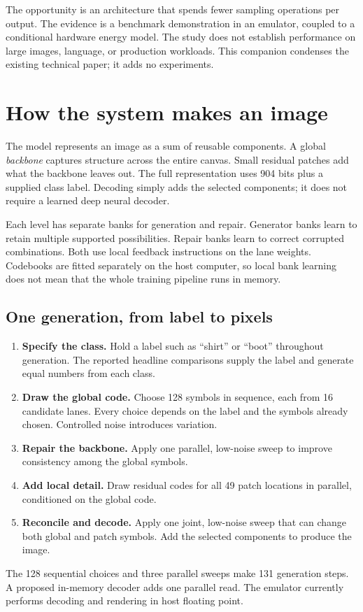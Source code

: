 \documentclass[11pt,letterpaper]{article}
\begin{document}
The opportunity is an architecture that spends fewer sampling operations per output. The evidence is a benchmark demonstration in an emulator, coupled to a conditional hardware energy model. The study does not establish performance on large images, language, or production workloads. This companion condenses the existing technical paper; it adds no experiments.

\newpage
\section{How the system makes an image}
The model represents an image as a sum of reusable components. A global \emph{backbone} captures structure across the entire canvas. Small residual patches add what the backbone leaves out. The full representation uses 904 bits plus a supplied class label. Decoding simply adds the selected components; it does not require a learned deep neural decoder.

Each level has separate banks for generation and repair. Generator banks learn to retain multiple supported possibilities. Repair banks learn to correct corrupted combinations. Both use local feedback instructions on the lane weights. Codebooks are fitted separately on the host computer, so local bank learning does not mean that the whole training pipeline runs in memory.

\subsection{One generation, from label to pixels}
\begin{enumerate}
\item \textbf{Specify the class.} Hold a label such as ``shirt'' or ``boot'' throughout generation. The reported headline comparisons supply the label and generate equal numbers from each class.
\item \textbf{Draw the global code.} Choose 128 symbols in sequence, each from 16 candidate lanes. Every choice depends on the label and the symbols already chosen. Controlled noise introduces variation.
\item \textbf{Repair the backbone.} Apply one parallel, low-noise sweep to improve consistency among the global symbols.
\item \textbf{Add local detail.} Draw residual codes for all 49 patch locations in parallel, conditioned on the global code.
\item \textbf{Reconcile and decode.} Apply one joint, low-noise sweep that can change both global and patch symbols. Add the selected components to produce the image.
\end{enumerate}
The 128 sequential choices and three parallel sweeps make 131 generation steps. A proposed in-memory decoder adds one parallel read. The emulator currently performs decoding and rendering in host floating point.
\end{document}
